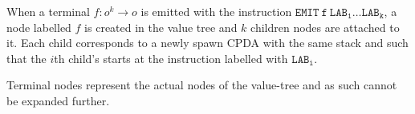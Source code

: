 \documentclass{article}
\begin{document}
When a terminal $f:o^k\rightarrow o$ is emitted with the instruction
$\mathtt{EMIT\ f\ LAB_1 \ldots LAB_k}$, a node labelled $f$ is created in the value tree and $k$ children nodes are attached to it. Each child corresponds to a newly spawn CPDA with the same stack
and such that the $i$th child's starts at the instruction labelled with $\mathtt{LAB_i}$.

Terminal nodes represent the actual nodes of the value-tree and as such cannot be expanded further.



\end{document}
